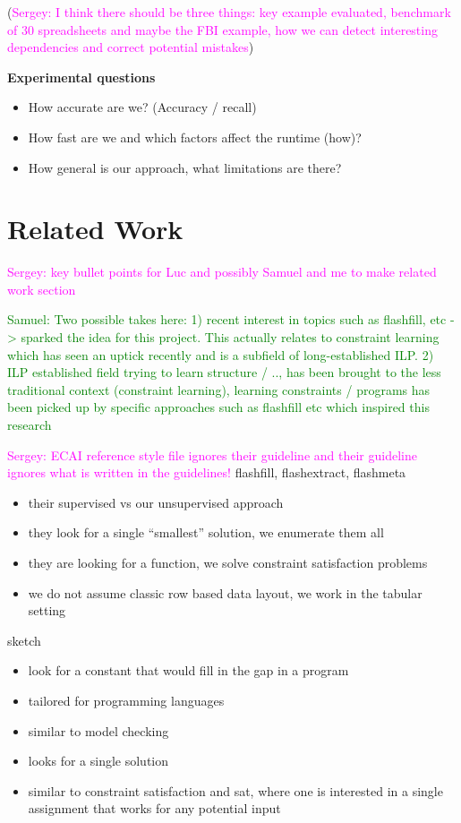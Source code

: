 \documentclass{ecai}
\newcommand{\sergey}[1]{\textcolor{magenta}{{\sc Sergey:} #1}\xspace}
\newcommand{\samuel}[1]{\textcolor{green}{{\sc Samuel:} #1}\xspace}
\begin{document}
(\sergey{I think there should be three things: key example evaluated, benchmark of 30 spreadsheets and maybe the FBI example, how we can detect interesting dependencies and correct potential mistakes})


{\bfseries
  Experimental questions
}

\begin{itemize}
  \item  How accurate are we? (Accuracy / recall)
  \item  How fast are we and which factors affect the runtime (how)?
  \item  How general is our approach, what limitations are there?
\end{itemize}


\section{Related Work}
\sergey{key bullet points for Luc and possibly Samuel and me to make related work section}

\samuel{Two possible takes here: 1) recent interest in topics such as flashfill, etc -> sparked the idea for this project. This actually relates to constraint learning which has seen an uptick recently and is a subfield of long-established ILP. 2) ILP established field trying to learn structure / .., has been brought to the less traditional context (constraint learning), learning constraints / programs has been picked up by specific approaches such as flashfill etc which inspired this research}

\sergey{ECAI reference style file ignores their guideline and their guideline ignores what is written in the guidelines!}
flashfill, flashextract, flashmeta \cite{flashfill,flashextract,flashmeta}
\begin{itemize}
  \item their supervised vs our unsupervised approach
  \item they look for a single ``smallest'' solution, we enumerate them all
  \item they are looking for a function, we solve constraint satisfaction problems
  \item we do not assume classic row based data layout, we work in the tabular setting
\end{itemize}

sketch \cite{sketch}
\begin{itemize}
  \item look for a constant that would fill in the gap in a program
  \item tailored for programming languages
  \item similar to model checking
  \item looks for a single solution
  \item similar to constraint satisfaction and sat, where one is interested in a single assignment that works for any potential input
\end{itemize}
\end{document}
